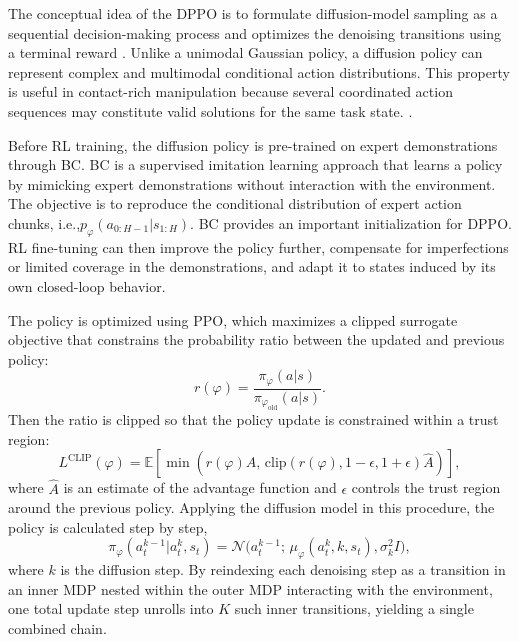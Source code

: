 The conceptual idea of the \ac{DPPO} is to formulate diffusion-model sampling as a sequential decision-making process and optimizes the denoising transitions using a terminal reward \cite{black2024trainingdiffusionmodelsreinforcement}. Unlike a unimodal Gaussian policy, a diffusion policy can represent complex and multimodal conditional action distributions. This property is useful in contact-rich manipulation because several coordinated action sequences may constitute valid solutions for the same task state. \cite{ren2024diffusionpolicypolicyoptimization}.

Before \ac{RL} training, the diffusion policy is pre-trained on expert demonstrations through \ac{BC}. \ac{BC} is a supervised imitation learning approach that learns a policy by mimicking expert demonstrations without interaction with the environment. The objective is to reproduce the conditional distribution of expert action chunks, i.e.,$p_\varphi(a_{0:H-1}| s_{1:H})$. BC provides an important initialization for DPPO. \ac{RL} fine-tuning can then improve the policy further, compensate for imperfections or limited coverage in the demonstrations, and adapt it to states induced by its own closed-loop behavior.

The policy is optimized using \ac{PPO}, which maximizes a clipped surrogate objective that constrains the probability ratio between the updated and previous policy:
\begin{equation}
    r(\varphi) = \frac{\pi_\varphi(a| s)}{\pi_{\varphi_{\text{old}}}(a| s)}.
\end{equation}
Then the ratio is clipped so that the policy update is constrained within a trust region:
\begin{equation}
    L^{\text{CLIP}}(\varphi) = \mathbb{E}\left[\min\left(r(\varphi)\hat{A}, \, \text{clip}(r(\varphi), 1-\epsilon, 1+\epsilon)\hat{A}\right)\right],
\end{equation}
where $\hat{A}$ is an estimate of the advantage function \citep{schulman2018highdimensionalcontinuouscontrolusing} and $\epsilon$ controls the trust region around the previous policy. Applying the diffusion model in this procedure, the policy is calculated step by step,
\begin{equation}
    \pi_\varphi(a_t^{k-1} | a_t^k, s_t) = \mathcal{N}\big(a_t^{k-1};\, \mu_\varphi(a_t^k, k, s_t), \sigma_k^2 I\big),
\end{equation}
where $k$ is the diffusion step. By reindexing each denoising step as a transition in an inner MDP nested within the outer MDP interacting with the environment, one total update step unrolls into $K$ such inner transitions, yielding a single combined chain.

